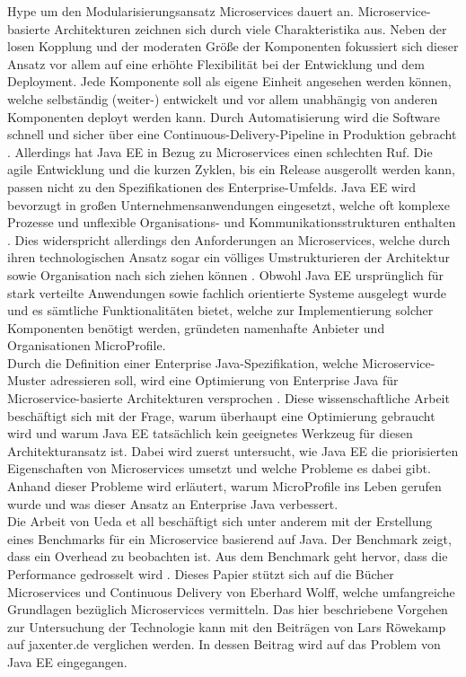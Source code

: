  Hype um den Modularisierungsansatz Microservices dauert an. Microservice-basierte Architekturen zeichnen sich durch viele Charakteristika aus. Neben der losen Kopplung und der moderaten Größe der Komponenten fokussiert sich dieser Ansatz vor allem auf eine erhöhte Flexibilität bei der Entwicklung und dem Deployment. Jede Komponente soll als eigene Einheit angesehen werden können, welche selbständig (weiter-) entwickelt und vor allem unabhängig von anderen Komponenten deployt werden kann. Durch Automatisierung wird die Software schnell und sicher über eine Continuous-Delivery-Pipeline in Produktion gebracht \cite{EberhardWolff.2015}. Allerdings hat Java EE in Bezug zu Microservices einen schlechten Ruf. Die agile Entwicklung und die kurzen Zyklen, bis ein Release ausgerollt werden kann, passen nicht zu den Spezifikationen des Enterprise-Umfelds. Java EE wird bevorzugt in großen Unternehmensanwendungen eingesetzt, welche oft komplexe Prozesse und unflexible Organisations- und Kommunikationsstrukturen enthalten \cite{jaxcenter.2016}. Dies widerspricht allerdings den Anforderungen an Microservices, welche durch ihren technologischen Ansatz sogar ein völliges Umstrukturieren der Architektur sowie Organisation nach sich ziehen können \cite{EberhardWolff.2015}. Obwohl Java EE ursprünglich für stark verteilte Anwendungen sowie fachlich orientierte Systeme ausgelegt wurde und es sämtliche Funktionalitäten bietet, welche zur Implementierung solcher Komponenten benötigt werden, gründeten namenhafte Anbieter und Organisationen MicroProfile.\\
Durch die Definition einer Enterprise Java-Spezifikation, welche Microservice-Muster adressieren soll, wird eine Optimierung von Enterprise Java für Microservice-basierte Architekturen versprochen \cite{Microprofile.2017}. Diese wissenschaftliche Arbeit beschäftigt sich mit der Frage, warum überhaupt eine Optimierung gebraucht wird und warum Java EE tatsächlich kein geeignetes Werkzeug für diesen Architekturansatz ist. Dabei wird zuerst untersucht, wie Java EE die priorisierten Eigenschaften von Microservices umsetzt und welche Probleme es dabei gibt. Anhand dieser Probleme wird erläutert, warum MicroProfile ins Leben gerufen wurde und was dieser Ansatz an Enterprise Java verbessert. \\
Die Arbeit von Ueda et all beschäftigt sich unter anderem mit der Erstellung eines Benchmarks für ein Microservice basierend auf Java. Der Benchmark zeigt, dass ein Overhead  zu beobachten ist. Aus dem Benchmark geht hervor, dass die Performance  gedrosselt wird \cite{uht.2016}. Dieses Papier stützt sich auf die Bücher Microservices \cite{EberhardWolff.2015} und Continuous Delivery \cite{EberhardWolff.2016} von Eberhard Wolff, welche umfangreiche Grundlagen bezüglich Microservices vermitteln. Das hier beschriebene Vorgehen zur Untersuchung der Technologie kann mit den Beiträgen von Lars Röwekamp auf jaxenter.de verglichen werden. In dessen Beitrag wird auf das Problem von Java EE eingegangen. \\ \\
